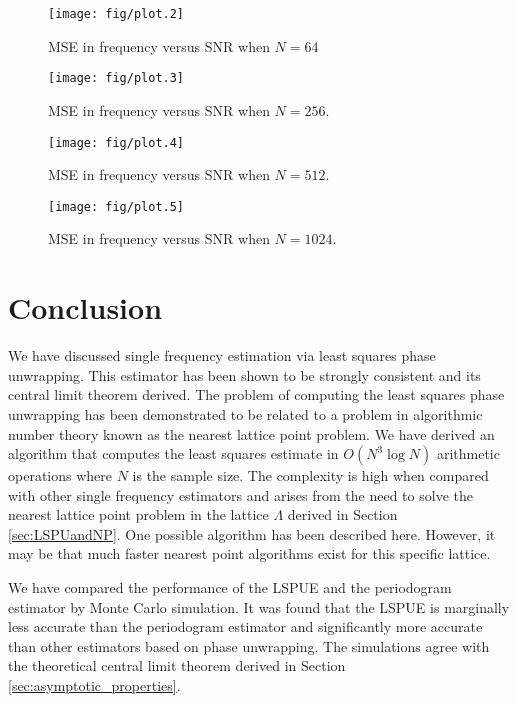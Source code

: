 \documentclass[journal]{IEEEtran}
\begin{document}
\begin{figure}[htbp]
	\centering
		\texttt{[image: fig/plot.2]}
		\caption{MSE in frequency versus SNR when $N=64$}
		\label{plot:MSEvSNRn=64}
\end{figure}

\begin{figure}[htbp]
	\centering
		\texttt{[image: fig/plot.3]}
		\caption{MSE in frequency versus SNR when $N=256$.}
		\label{plot:MSEvSNRn=256}
\end{figure}

\begin{figure}[htbp]
	\centering
		\texttt{[image: fig/plot.4]}
		\caption{MSE in frequency versus SNR when $N=512$.}
		\label{plot:MSEvSNRn=512}
\end{figure}

\begin{figure}[htbp]
	\centering
		\texttt{[image: fig/plot.5]}
		\caption{MSE in frequency versus SNR when $N=1024$.}
		\label{plot:MSEvSNRn=1024}
\end{figure}



\section{Conclusion}\label{sec:conclusion}

We have discussed single frequency estimation via least squares phase
unwrapping. This estimator has been shown to be strongly consistent and its
central limit theorem derived. The problem of computing the least squares
phase unwrapping has been demonstrated to be related to a problem in
algorithmic number theory known as the nearest lattice point problem. We have
derived an algorithm that computes the least squares estimate in
$O(N^3\log{N})$ arithmetic operations where $N$ is the sample size.  The
complexity is high when compared with other single frequency estimators and
arises from the need to solve the nearest lattice point problem in the lattice
$\Lambda$ derived in Section \ref{sec:LSPUandNP}.  One possible algorithm has
been described here.  However, it may be that much faster nearest point
algorithms exist for this specific lattice.

We have compared the performance of the LSPUE and the periodogram estimator
\cite{Rife1974} by Monte Carlo simulation.  It was found that the LSPUE is
marginally less accurate than the periodogram estimator and significantly more
accurate than other estimators based on phase unwrapping.  The simulations
agree with the theoretical central limit theorem derived in Section
\ref{sec:asymptotic_properties}.
\end{document}
